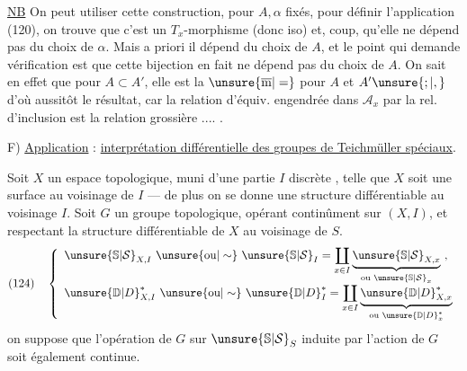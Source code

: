 \uline{NB} On peut utiliser cette construction, pour $A,\alpha$ fixés,
pour définir l'application (120), on trouve que c'est un
$T_x$-morphisme (donc iso) et,
coup, qu'elle ne dépend pas du choix de $\alpha$.
Mais a priori il dépend  du choix de $A$, et le point qui
demande vérification est que cette bijection en fait ne dépend pas du choix
de $A$. On sait en effet que pour $A\subset A'$, elle est la
$\unsure{\overline{\mathrm m}|=}$ pour $A$ et $A'\unsure{;|,}$
d'où aussitôt le résultat, car la relation d'équiv. engendrée dans
$\mathcal{A}_x$ par la rel. d'inclusion est la relation grossière .... .




F) \uline{Application} : \uline{interprétation différentielle des groupes
de Teichmüller spéciaux}.

Soit $X$ un espace topologique, muni d'une partie $I$ discrète
, telle que $X$ soit une surface au voisinage de $I$ ---
de plus on se donne une structure différentiable 
au voisinage  $I$. Soit $G$  un groupe
topologique, opérant continûment sur $(X,I)$, et respectant la structure
différentiable de $X$ au voisinage de $S$. 
\[
(124)\quad\left\{\begin{array}{l}
\unsure{\mathbb{S}|\mathcal{S}}_{X,I}\ \unsure{\text{ou}|\sim}\ \unsure{\mathbb{S}|\mathcal{S}}_I
=\displaystyle\coprod_{x\in I}
\underbrace{\unsure{\mathbb{S}|\mathcal{S}}_{X,x}}_{\text{ou }\unsure{\mathbb{S}|\mathcal{S}}_x}\ ,\\[8pt]
\unsure{\mathbb{D}|D}_{X,I}^{*}\ \unsure{\text{ou}|\sim}\ \unsure{\mathbb{D}|D}_{I}^{*}
=\displaystyle\coprod_{x\in I}
\underbrace{\unsure{\mathbb{D}|D}_{X,x}^{*}}_{\text{ou }\unsure{\mathbb{D}|D}_x^{*}}
\end{array}\right.
\]
on suppose que l'opération de $G$ sur $\unsure{\mathbb{S}|\mathcal{S}}_S$ induite par
l'action de $G$ soit également continue.

